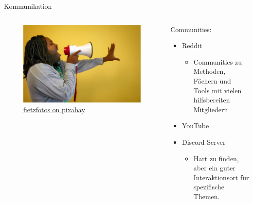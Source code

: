 \begin{frame}{Kommunikation}
    \begin{columns}[t]
        \begin{column}{0.4\textwidth}
            \vspace{-2em} 
            \begin{figure}
                \begin{flushleft}
                    \includegraphics[height=0.8\textheight,trim={4cm 0 17cm 0},clip]{graphics/call-2946023_1280.jpg}
                    \caption*{\href{https://pixabay.com/photos/call-afro-megaphone-scream-symbol-2946023/}{fietzfotos on pixabay}}    
                \end{flushleft}                
            \end{figure}            
        \end{column}
        \begin{column}{0.6\textwidth}
            Communities:
            \begin{itemize}
                \item Reddit 
                \begin{itemize}
                    \item Communities zu Methoden, Fächern und Tools mit vielen hilfsbereiten Mitgliedern
                \end{itemize} 
                \item YouTube 
                \item Discord Server
                \begin{itemize}
                    \item Hart zu finden, aber ein guter Interaktionsort für spezifische Themen.
                \end{itemize}        
            \end{itemize}
        \end{column}
    \end{columns}
\end{frame}